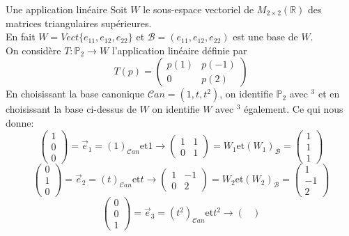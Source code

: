  \begin{parag}{Une application linéaire}
     Soit $W$ le sous-espace vectoriel de $M_{2\times2}\left(\mathbb{R}\right)$ des matrices triangulaires supérieures.
     \\
     En fait $W = Vect\{e_{11}, e_{12}, e_{22}\}$ et $\mathcal{B} = (e_{11}, e_{12}, e_{22})$ est une base de $W$.
     \\
     On considère $T : \mathbb{P}_2 \to W$ l'application linéaire définie par
     \[T\left(p\right) = \begin{pmatrix}
         p\left(1\right) & p\left(-1\right) \\
         0 & p\left(2\right)
     \end{pmatrix}\]
     En choisissant la base canonique $\mathcal{C}an = \left(1, t, t^2\right)$, on identifie $\mathbb{P}_2$ avec \R$^3$ et en choisissant la base ci-dessus de $W$ on identifie $W$ avec \R$^3$ également. Ce qui nous donne:
     \[\begin{pmatrix}
         1 \\ 0 \\ 0
     \end{pmatrix} = \vec{e}_1 = \left(1\right)_{\mathcal{C}an} \text{et} 1 \to \begin{pmatrix}
         1 & 1 \\ 0 & 1
     \end{pmatrix} = W_1 \text{et} \left(W_1\right)_{\mathcal{B}} = \begin{pmatrix}
         1 \\ 1 \\ 1
     \end{pmatrix}\]
     \[\begin{pmatrix}
         0 \\ 1 \\ 0
     \end{pmatrix} = \vec{e}_2 = \left(t\right)_{\mathcal{C}an} \text{et} t \to \begin{pmatrix}
         1 & -1 \\ 0 & 2
     \end{pmatrix} = W_2 \text{et} \left(W_2\right)_{\mathcal{B}} = \begin{pmatrix}
         1 \\ -1 \\ 2
     \end{pmatrix}\]
     \[\begin{pmatrix}
         0 \\ 0 \\ 1
     \end{pmatrix} = \vec{e}_3 = \left(t^2\right)_{\mathcal{C}an} \text{et} t^2 \to \begin{pmatrix}

\end{pmatrix}\]
\end{parag}
